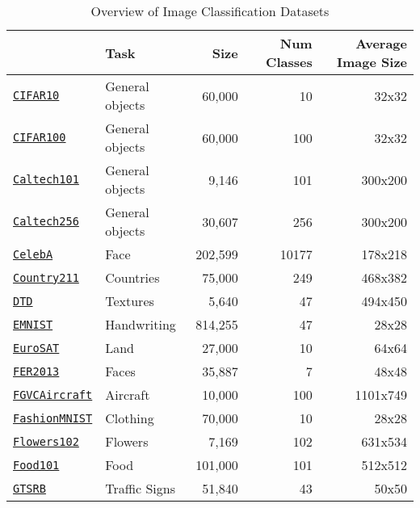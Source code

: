 \begin{table}[htbp]
\centering
\caption{Overview of Image Classification Datasets}
\label{tab:datasets}
\begin{tabular}{llrrr}
\toprule
 & Task & Size & Num Classes & Average Image Size \\
\midrule
\href{https://www.cs.toronto.edu/~kriz/cifar.html}{\texttt{CIFAR10}} & General objects & 60,000 & 10 & 32x32 \\
\href{https://www.cs.toronto.edu/~kriz/cifar.html}{\texttt{CIFAR100}} & General objects & 60,000 & 100 & 32x32 \\
\href{https://data.caltech.edu/records/mzrjq-6wc02}{\texttt{Caltech101}} & General objects & 9,146 & 101 & 300x200 \\
\href{https://data.caltech.edu/records/20087}{\texttt{Caltech256}} & General objects & 30,607 & 256 & 300x200 \\
\href{https://mmlab.ie.cuhk.edu.hk/projects/CelebA.html}{\texttt{CelebA}} & Face & 202,599 & 10177 & 178x218 \\
\href{https://github.com/openai/CLIP/blob/main/data/country211.md}{\texttt{Country211}} & Countries & 75,000 & 249 & 468x382 \\
\href{https://www.robots.ox.ac.uk/~vgg/data/dtd/}{\texttt{DTD}} & Textures & 5,640 & 47 & 494x450 \\
\href{https://www.westernsydney.edu.au/icns/resources/reproducible_research3/publication_support_materials2/emnist}{\texttt{EMNIST}} & Handwriting & 814,255 & 47 & 28x28 \\
\href{https://github.com/phelber/eurosat}{\texttt{EuroSAT}} & Land & 27,000 & 10 & 64x64 \\
\href{https://www.kaggle.com/c/challenges-in-representation-learning-facial-expression-recognition-challenge}{\texttt{FER2013}} & Faces & 35,887 & 7 & 48x48 \\
\href{https://www.robots.ox.ac.uk/~vgg/data/fgvc-aircraft/}{\texttt{FGVCAircraft}} & Aircraft & 10,000 & 100 & 1101x749 \\
\href{https://github.com/zalandoresearch/fashion-mnist}{\texttt{FashionMNIST}} & Clothing & 70,000 & 10 & 28x28 \\
\href{https://www.robots.ox.ac.uk/~vgg/data/flowers/102/}{\texttt{Flowers102}} & Flowers & 7,169 & 102 & 631x534 \\
\href{https://data.vision.ee.ethz.ch/cvl/datasets_extra/food-101/}{\texttt{Food101}} & Food & 101,000 & 101 & 512x512 \\
\href{https://benchmark.ini.rub.de/}{\texttt{GTSRB}} & Traffic Signs & 51,840 & 43 & 50x50 \\

\end{tabular}
\end{table}
